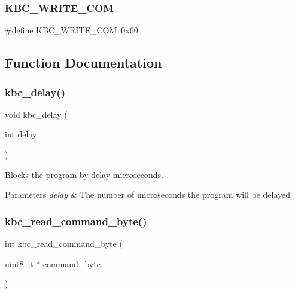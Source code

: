 \mbox{\label{group__kbc_ga09cb7b27cd3f4d0408f453da78ca294e}} 
\subsubsection{\texorpdfstring{K\+B\+C\+\_\+\+W\+R\+I\+T\+E\+\_\+\+C\+OM}{KBC\_WRITE\_COM}}
{\footnotesize\ttfamily \#define K\+B\+C\+\_\+\+W\+R\+I\+T\+E\+\_\+\+C\+OM~0x60}



\subsection{Function Documentation}
\mbox{\label{group__kbc_ga594c74b8ef8c0d8a660bcdb729b1f381}} 
\subsubsection{\texorpdfstring{kbc\+\_\+delay()}{kbc\_delay()}}
{\footnotesize\ttfamily void kbc\+\_\+delay (\begin{DoxyParamCaption}\item[{int}]{delay }\end{DoxyParamCaption})}



Blocks the program by delay microseconds. 


\begin{DoxyParams}{Parameters}
{\em delay} & The number of microseconds the program will be delayed \\
\hline
\end{DoxyParams}
\mbox{\label{group__kbc_gadc6d5fbf9c3a43d168962776591ac75b}} 
\subsubsection{\texorpdfstring{kbc\+\_\+read\+\_\+command\+\_\+byte()}{kbc\_read\_command\_byte()}}
{\footnotesize\ttfamily int kbc\+\_\+read\+\_\+command\+\_\+byte (\begin{DoxyParamCaption}\item[{uint8\+\_\+t $\ast$}]{command\+\_\+byte }\end{DoxyParamCaption})}



